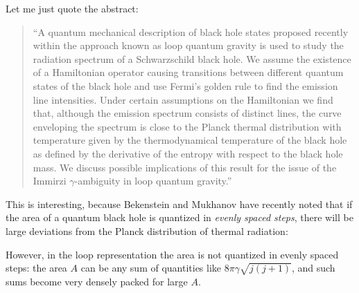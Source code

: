 \documentclass{article}
\def\tightlist{}
\renewcommand{\texttt}[1]{%
  \begingroup
  \ttfamily
  \begingroup\lccode`~=`/\lowercase{\endgroup\def~}{/\discretionary{}{}{}}%
  \begingroup\lccode`~=`[\lowercase{\endgroup\def~}{[\discretionary{}{}{}}%
  \begingroup\lccode`~=`.\lowercase{\endgroup\def~}{.\discretionary{}{}{}}%
  \catcode`/=\active\catcode`[=\active\catcode`.=\active
  \scantokens{#1\noexpand}%
  \endgroup
}
\begin{document}

Let me just quote the abstract:

\begin{quote}
``A quantum mechanical description of black hole states proposed
recently within the approach known as loop quantum gravity is used to
study the radiation spectrum of a Schwarzschild black hole. We assume
the existence of a Hamiltonian operator causing transitions between
different quantum states of the black hole and use Fermi's golden rule
to find the emission line intensities. Under certain assumptions on the
Hamiltonian we find that, although the emission spectrum consists of
distinct lines, the curve enveloping the spectrum is close to the Planck
thermal distribution with temperature given by the thermodynamical
temperature of the black hole as defined by the derivative of the
entropy with respect to the black hole mass. We discuss possible
implications of this result for the issue of the Immirzi
\(\gamma\)-ambiguity in loop quantum gravity.''
\end{quote}

This is interesting, because Bekenstein and Mukhanov have recently noted
that if the area of a quantum black hole is quantized in \emph{evenly
spaced steps}, there will be large deviations from the Planck
distribution of thermal radiation:


However, in the loop representation the area is not quantized in evenly
spaced steps: the area \(A\) can be any sum of quantities like
\(8\pi\gamma\sqrt{j(j+1)}\), and such sums become very densely packed
for large \(A\).
\end{document}
